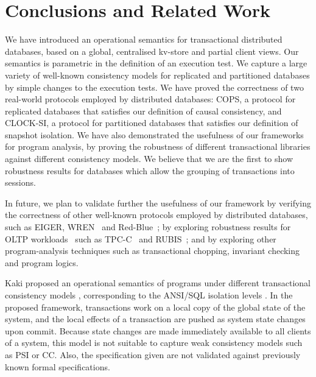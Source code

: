 \section{Conclusions and Related Work}
\label{sec:conclusions}
We have introduced  an  operational semantics for 
transactional distributed databases, based on a global, centralised 
kv-store and partial client views. 
Our semantics is parametric in the definition of an execution test.
We capture a large variety of well-known consistency models 
for replicated and partitioned databases by simple changes to  the execution tests. 
We have proved the correctness of two real-world protocols employed by distributed 
databases: COPS, a 
protocol for replicated databases that satisfies our definition of causal consistency, 
and CLOCK-SI, a protocol for partitioned databases that satisfies our
definition of 
snapshot isolation. We have also demonstrated the usefulness of our frameworks 
for program analysis, by proving the robustness of different transactional 
libraries against different consistency models. We believe that we are
the first to show robustness results for  databases which  allow
the grouping of  transactions into sessions. 

In future, we plan to validate further the usefulness of our framework
by verifying the correctness of other well-known protocols employed by
distributed databases, such as EIGER\cite{.}, WREN~\cite{.} and
Red-Blue~\cite{.}; by exploring robustness results for OLTP
workloads~\cite{.}  such as TPC-C~\cite{.} and RUBIS~\cite{.};
and by exploring other program-analysis techniques such as
transactional chopping, invariant checking and program
logics. 



Kaki \etal proposed an operational semantics of programs 
under different transactional consistency models \cite{alonetogether}, 
corresponding to the ANSI/SQL isolation levels \cite{si}.
In the proposed framework, transactions work on a local copy of the global state 
of the system, and the local effects of a transaction are pushed as 
system state changes upon commit. Because state changes 
are made immediately available to all clients of a system, this model 
is not suitable to capture weak consistency models such as PSI or CC. 
Also, the specification given are not validated against previously known 
formal specifications.

